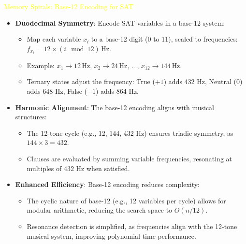 \textcolor{yellow}{ Memory Spirals: Base-12 Encoding for SAT } \\
\begin{itemize}
    \item \texttt{} \textbf{Duodecimal Symmetry}: Encode SAT variables in a base-12 system:
    \begin{itemize}
        \item Map each variable \(x_i\) to a base-12 digit (0 to 11), scaled to frequencies: \(f_{x_i} = 12 \times (i \mod 12) \, \text{Hz}\).
        \item Example: \(x_1 \rightarrow 12 \, \text{Hz}\), \(x_2 \rightarrow 24 \, \text{Hz}\), ..., \(x_{12} \rightarrow 144 \, \text{Hz}\).
        \item Ternary states adjust the frequency: True (\(+1\)) adds 432 Hz, Neutral (\(0\)) adds 648 Hz, False (\(-1\)) adds 864 Hz.
    \end{itemize}
    \item \texttt{} \textbf{Harmonic Alignment}: The base-12 encoding aligns with musical structures:
    \begin{itemize}
        \item The 12-tone cycle (e.g., 12, 144, 432 Hz) ensures triadic symmetry, as \(144 \times 3 = 432\).
        \item Clauses are evaluated by summing variable frequencies, resonating at multiples of 432 Hz when satisfied.
    \end{itemize}
    \item \texttt{} \textbf{Enhanced Efficiency}: Base-12 encoding reduces complexity:
    \begin{itemize}
        \item The cyclic nature of base-12 (e.g., 12 variables per cycle) allows for modular arithmetic, reducing the search space to \(O(n/12)\).
        \item Resonance detection is simplified, as frequencies align with the 12-tone musical system, improving polynomial-time performance.
    \end{itemize}
\end{itemize}

